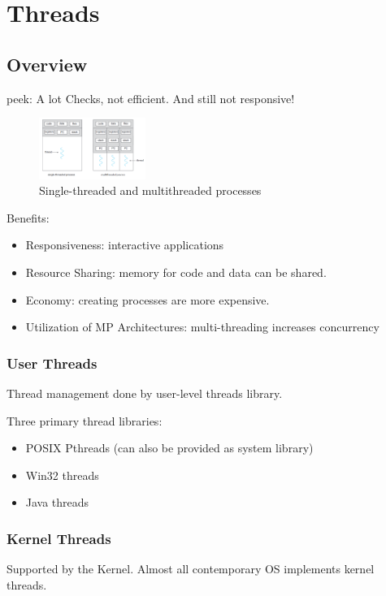 \newpage
\section{Threads}
\subsection{Overview}
peek: A lot Checks, not efficient. And still not responsive!

\begin{figure}[!htb]
    \centering
    \includegraphics[width=0.309\textwidth]{pic/OS4/Single-threaded and multithreaded processes}
    \caption{Single-threaded and multithreaded processes}
\end{figure}

Benefits:
\begin{itemize}
    \item Responsiveness: interactive applications
    \item Resource Sharing: memory for code and data can be shared.
    \item Economy: creating processes are more expensive.
    \item Utilization of MP Architectures: multi-threading increases concurrency
\end{itemize}

\subsubsection{User Threads}
Thread management done by user-level threads library. 

Three primary thread libraries:
\begin{itemize}
    \item POSIX Pthreads (can also be provided as system library)
    \item Win32 threads
    \item Java threads
\end{itemize}

\subsubsection{Kernel Threads}
Supported by the Kernel. Almost all contemporary OS implements kernel threads.

